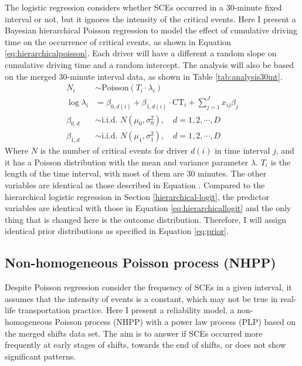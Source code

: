 \documentclass[12pt]{book}
\numberwithin{equation}{chapter}
\begin{document}
The logistic regression considers whether SCEs occurred in a 30-minute fixed interval or not, but it ignores the intensity of the critical events. Here I present a Bayesian hierarchical Poisson regression to model the effect of cumulative driving time on the occurrence of critical events, as shown in Equation \eqref{eq:hierarchicalpoisson}. Each driver will have a different a random slope on cumulative driving time and a random intercept. The analysis will also be based on the merged 30-minute interval data, as shown in Table \ref{tab:analysis30int}.
\begin{equation}
\begin{aligned}
N_{i}  & \sim \text{Poisson}(T_i\cdot\lambda_i)\\
\log\lambda_{i} & =\beta_{0, d(i)} + \beta_{1, d(i)} \cdot \text{CT}_i + \sum_{j=1}^{J} x_{ij}\beta_j\\
\beta_{0, d} &\sim \text{i.i.d. } N(\mu_0, \sigma_0^2), \quad d = 1, 2, \cdots, D\\
\beta_{1, d} &\sim \text{i.i.d. } N(\mu_1, \sigma_1^2), \quad d = 1, 2, \cdots, D
\label{eq:hierarchicalpoisson}
\end{aligned}
\end{equation}
Where \(N\) is the number of critical events for driver \(d(i)\) in time interval \(j\), and it has a Poisson distribution with the mean and variance parameter \(\lambda\). \(T_i\) is the length of the time interval, with most of them are 30 minutes. The other variables are identical as those described in Equation . Compared to the hierarchical logistic regression in Section \ref{hierarchical-logit}, the predictor variables are identical with those in Equation \eqref{eq:hierarchicallogit} and the only thing that is changed here is the outcome distribution. Therefore, I will assign identical prior distributions as specified in Equation \eqref{eq:prior}.

\hypertarget{non-homogeneous-poisson-process-nhpp}{%
\subsection{Non-homogeneous Poisson process (NHPP)}\label{non-homogeneous-poisson-process-nhpp}}

Despite Poisson regression consider the frequency of SCEs in a given interval, it assumes that the intensity of events is a constant, which may not be true in real-life transportation practice. Here I present a reliability model, a non-homogeneous Poisson process (NHPP) with a power law process (PLP) based on the merged shifts data set. The aim is to answer if SCEs occurred more frequently at early stages of shifts, towards the end of shifts, or does not show significant patterns.
\end{document}
